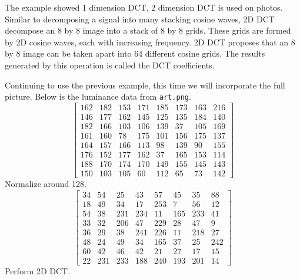 \documentclass{article}
\begin{document}
The example showed 1 dimension DCT, 2 dimension DCT is used on photos.
Similar to decomposing a signal into many stacking cosine waves, 2D DCT decompose an 8 by 8 image into a stack of 8 by 8 grids.
These grids are formed by 2D cosine waves, each with increasing frequency.
2D DCT proposes that an 8 by 8 image can be taken apart into 64 different cosine grids.
The results generated by this operation is called the DCT coefficients.

Continuing to use the previous example, this time we will incorporate the full picture.
Below is the luminance data from \texttt{art.png}.
\begin{equation*}
\begin{bmatrix}
	162 & 182 & 153 & 171 & 185 & 173 & 163 & 216 \\
	146 & 177 & 162 & 145 & 125 & 135 & 184 & 140 \\
	182 & 166 & 103 & 106 & 139 &  37 & 105 & 169 \\
	161 & 160 &  78 & 175 & 101 & 156 & 175 & 137 \\
	164 & 157 & 166 & 113 &  98 & 139 &  90 & 155 \\
	176 & 152 & 177 & 162 &  37 & 165 & 153 & 114 \\
	188 & 170 & 174 & 170 & 149 & 155 & 145 & 143 \\
	150 & 103 & 105 &  60 & 112 &  65 &  73 & 142
\end{bmatrix}
\end{equation*}
Normalize around 128.
\begin{equation*}
\begin{bmatrix}
	34 &  54 &  25 &  43 &  57 &  45 &  35 &  88 \\
	18 &  49 &  34 &  17 & 253 &   7 &  56 &  12 \\
	54 &  38 & 231 & 234 &  11 & 165 & 233 &  41 \\
	33 &  32 & 206 &  47 & 229 &  28 &  47 &   9 \\
	36 &  29 &  38 & 241 & 226 &  11 & 218 &  27 \\
	48 &  24 &  49 &  34 & 165 &  37 &  25 & 242 \\
	60 &  42 &  46 &  42 &  21 &  27 &  17 &  15 \\
	22 & 231 & 233 & 188 & 240 & 193 & 201 &  14
\end{bmatrix}
\end{equation*}
Perform 2D DCT.
\end{document}
